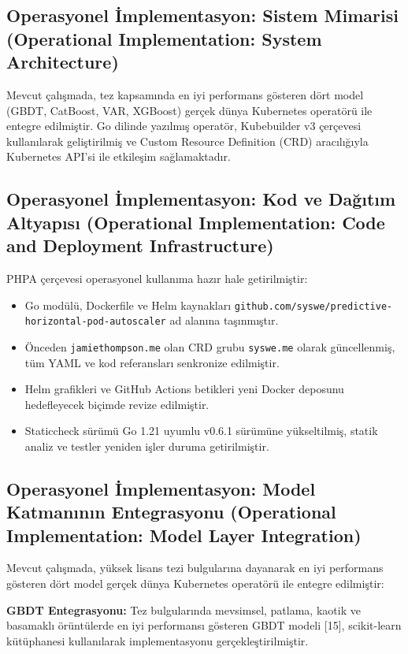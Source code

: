 \documentclass[12pt,a4paper]{article}
\begin{document}
\subsection{Operasyonel İmplementasyon: Sistem Mimarisi (Operational Implementation: System Architecture)}

Mevcut çalışmada, tez kapsamında en iyi performans gösteren dört model (GBDT, CatBoost, VAR, XGBoost) gerçek dünya Kubernetes operatörü ile entegre edilmiştir. Go dilinde yazılmış operatör, Kubebuilder v3 çerçevesi kullanılarak geliştirilmiş ve Custom Resource Definition (CRD) aracılığıyla Kubernetes API'si ile etkileşim sağlamaktadır.

\subsection{Operasyonel İmplementasyon: Kod ve Dağıtım Altyapısı (Operational Implementation: Code and Deployment Infrastructure)}

PHPA çerçevesi operasyonel kullanıma hazır hale getirilmiştir:

\begin{itemize}[noitemsep]
  \item Go modülü, Dockerfile ve Helm kaynakları \texttt{github.com/syswe/predictive-horizontal-pod-autoscaler} ad alanına taşınmıştır.
  \item Önceden \texttt{jamiethompson.me} olan CRD grubu \texttt{syswe.me} olarak güncellenmiş, tüm YAML ve kod referansları senkronize edilmiştir.
  \item Helm grafikleri ve GitHub Actions betikleri yeni Docker deposunu hedefleyecek biçimde revize edilmiştir.
  \item Staticcheck sürümü Go 1.21 uyumlu v0.6.1 sürümüne yükseltilmiş, statik analiz ve testler yeniden işler duruma getirilmiştir.
\end{itemize}

\subsection{Operasyonel İmplementasyon: Model Katmanının Entegrasyonu (Operational Implementation: Model Layer Integration)}

Mevcut çalışmada, yüksek lisans tezi bulgularına dayanarak en iyi performans gösteren dört model gerçek dünya Kubernetes operatörü ile entegre edilmiştir:

\textbf{GBDT Entegrasyonu:} Tez bulgularında mevsimsel, patlama, kaotik ve basamaklı örüntülerde en iyi performansı gösteren GBDT modeli [15], scikit-learn kütüphanesi kullanılarak implementasyonu gerçekleştirilmiştir.
\end{document}
